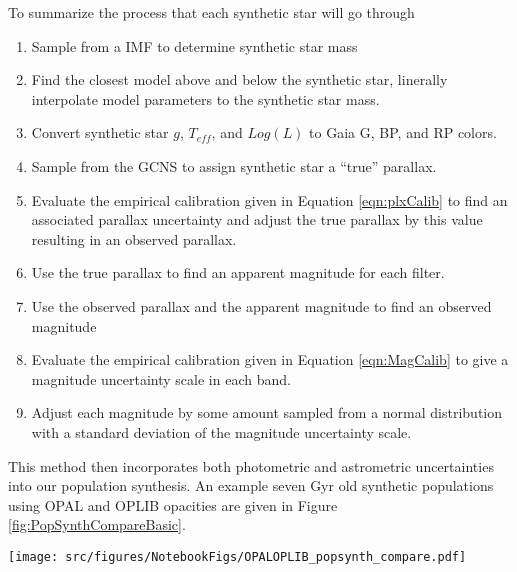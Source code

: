 To summarize the process that each synthetic star will go through
\begin{enumerate}
	\item Sample from a \citet{Sollima2019} IMF to determine synthetic star mass
	\item Find the closest model above and below the synthetic star, linerally
		interpolate model parameters to the synthetic star mass.
	\item Convert synthetic star $g$, $T_{eff}$, and $Log(L)$ to Gaia G, BP,
		and RP colors.
	\item Sample from the GCNS to assign synthetic star a ``true'' parallax.
	\item Evaluate the empirical calibration given in Equation
		\ref{eqn:plxCalib} to find an associated parallax uncertainty and
		adjust the true parallax by this value resulting in an observed
		parallax.
	\item Use the true parallax to find an apparent magnitude for each filter.
	\item Use the observed parallax and the apparent magnitude to find an
		observed magnitude
	\item Evaluate the empirical calibration given in Equation
		\ref{eqn:MagCalib} to give a magnitude uncertainty scale in each band.
	\item Adjust each magnitude by some amount sampled from a normal
		distribution with a standard deviation of the magnitude uncertainty
		scale.
\end{enumerate}

This method then incorporates both photometric and astrometric uncertainties
into our population synthesis. An example seven Gyr old synthetic populations
using OPAL and OPLIB opacities are given in Figure
\ref{fig:PopSynthCompareBasic}.

\begin{figure*}
	\centering
	\texttt{[image: src/figures/NotebookFigs/OPALOPLIB\_popsynth\_compare.pdf]}
	\caption{Population synthesis results for models evolved with OPAL (left)
	and models evolved with OPLIB (right). A Gaussian kernel-density-estimate
	has been overlaid to better highlight the density variations. {\color{red}
	[THIS IS A PLACEHOLDER FIGURE]}}
	\label{fig:PopSynthCompareBasic}
\end{figure*}

